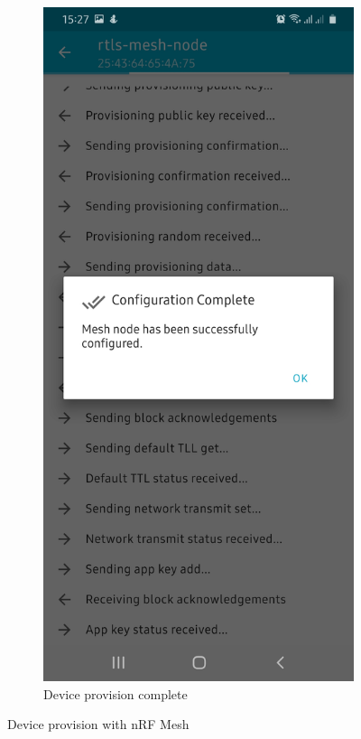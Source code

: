 \documentclass[\main/main.tex]{subfiles}
\begin{document}
\begin{figure}[H]
\begin{subfigure}[b]{0.4\linewidth}
        \includegraphics[width=0.65\linewidth]{nRF_Mesh_03.jpg}
        \caption{Device provision complete}
    \end{subfigure}
    \caption{Device provision with nRF Mesh}
    \label{fig:device_provision_with_nrf_mesh_01}
\end{figure}
\end{document}
